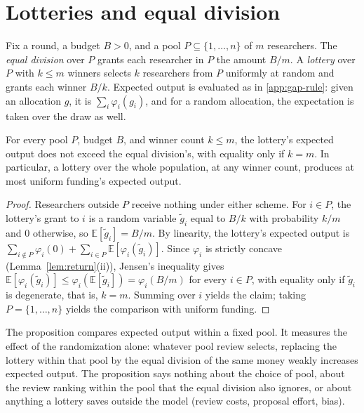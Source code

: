\section{Lotteries and equal division}\label{app:lottery}

Fix a round, a budget $B > 0$, and a pool $P \subseteq \{1, \ldots, n\}$ of $m$ researchers. The \emph{equal division} over $P$ grants each researcher in $P$ the amount $B/m$. A \emph{lottery} over $P$ with $k \leq m$ winners selects $k$ researchers from $P$ uniformly at random and grants each winner $B/k$. Expected output is evaluated as in \ref{app:gap-rule}: given an allocation $g$, it is $\sum_i \varphi_i(g_i)$, and for a random allocation, the expectation is taken over the draw as well.

\begin{prop}\label{prop:lottery}
For every pool $P$, budget $B$, and winner count $k \leq m$, the lottery's expected output does not exceed the equal division's, with equality only if $k = m$. In particular, a lottery over the whole population, at any winner count, produces at most uniform funding's expected output.
\end{prop}

\begin{proof}
Researchers outside $P$ receive nothing under either scheme. For $i \in P$, the lottery's grant to $i$ is a random variable $\tilde g_i$ equal to $B/k$ with probability $k/m$ and $0$ otherwise, so $\mathbb{E}[\tilde g_i] = B/m$. By linearity, the lottery's expected output is $\sum_{i \notin P} \varphi_i(0) + \sum_{i \in P} \mathbb{E}[\varphi_i(\tilde g_i)]$. Since $\varphi_i$ is strictly concave (Lemma~\ref{lem:return}(ii)), Jensen's inequality gives $\mathbb{E}[\varphi_i(\tilde g_i)] \leq \varphi_i(\mathbb{E}[\tilde g_i]) = \varphi_i(B/m)$ for every $i \in P$, with equality only if $\tilde g_i$ is degenerate, that is, $k = m$. Summing over $i$ yields the claim; taking $P = \{1, \ldots, n\}$ yields the comparison with uniform funding.
\end{proof}

\begin{remark}
The proposition compares expected output within a fixed pool. It measures the effect of the randomization alone: whatever pool review selects, replacing the lottery within that pool by the equal division of the same money weakly increases expected output. The proposition says nothing about the choice of pool, about the review ranking within the pool that the equal division also ignores, or about anything a lottery saves outside the model (review costs, proposal effort, bias).
\end{remark}

